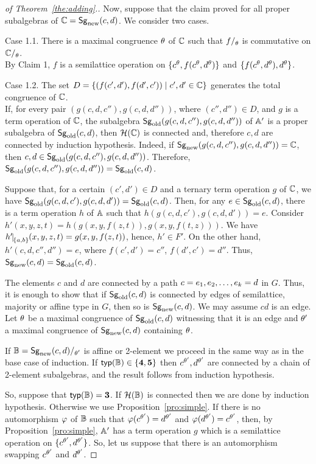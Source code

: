 \documentclass[11pt]{article}
\begin{document}
\begin{proof}[of Theorem~\ref{the:adding}.]
Now, suppose that the claim proved for all proper subalgebras of
${\mathbb C}={\sf Sg}_{\mathrm{new}}(c,d)$. We consider two cases.
\medskip

\noindent
{\sc Case 1.1.} There is a maximal congruence $\theta$ of
${\mathbb C}$ such that $f\fac\th$ is commutative on $\zC\fac\th$.\\[2mm]
By Claim 1, $f$ is a semilattice operation on
$\{c^\theta,f(c^\theta,d^\theta)\}$ and
$\{f(c^\theta,d^\theta),d^\theta\}$.
\medskip

\noindent
{\sc Case 1.2.} The set $D=\{(f(c',d'),f(d',c'))\mid c',d'\in{\mathbb C}\}$ 
generates the total congruence of ${\mathbb C}$.\\[2mm]
If, for every pair $(g(c,d,c''),g(c,d,d''))$, where $(c'',d'')\in D$, and $g$ is a term operation of ${\mathbb C}$,
the subalgebra ${\sf Sg}_{\mathrm{old}}(g(c,d,c''),g(c,d,d''))$ of ${\mathbb A}'$ is a
proper subalgebra of 
${\sf Sg}_{\mathrm{old}}(c,d)$, then ${\mathcal H}({\mathbb C})$ is connected and, therefore $c,d$ are connected 
by induction hypothesis. Indeed, if
${\sf Sg}_{\mathrm{new}}(g(c,d,c''),g(c,d,d''))={\mathbb C}$, then
$c,d\in{\sf Sg}_{\mathrm{old}}(g(c,d,c''),g(c,d,d''))$. Therefore,
${\sf Sg}_{\mathrm{old}}(g(c,d,c''),g(c,d,d''))={\sf Sg}_{\mathrm{old}}(c,d)$.

Suppose that, for a certain $(c',d')\in D$ and a ternary term
operation $g$ of ${\mathbb C}$, we have
${\sf Sg}_{\mathrm{old}}(g(c,d,c'),g(c,d,d'))={\sf Sg}_{\mathrm{old}}(c,d)$. Then, for any
$e\in{\sf Sg}_{\mathrm{old}}(c,d)$, there is a term operation $h$ of ${\mathbb A}$ such that
$h(g(c,d,c'),g(c,d,d'))=e$. Consider
$h'(x,y,z,t)=h(g(x,y,f(z,t)),g(x,y,f(t,z)))$. We have
$h'\red{\{a,b\}}(x,y,z,t)=g(x,y,f(z,t))$, hence, $h'\in F'$. On the
other hand, $h'(c,d,c'',d'')=e$, where $f(c',d')=c''$,
$f(d',c')=d''$. Thus, ${\sf Sg}_{\mathrm{new}}(c,d)={\sf Sg}_{\mathrm{old}}(c,d)$.

The elements $c$ and $d$ are connected by a path $c=e_1,e_2,\ldots, e_k=d$
in $G$. Thus, it is enough to show that if ${\sf Sg}_{\mathrm{old}}(c,d)$ is
connected by edges of semilattice, majority or affine type in $G$,
then so is ${\sf Sg}_{\mathrm{new}}(c,d)$. We may assume $cd$ is an edge. Let $\theta$ be a 
maximal congruence of
${\sf Sg}_{\mathrm{old}}(c,d)$ witnessing that it is an edge and $\theta'$ a maximal
congruence of ${\sf Sg}_{\mathrm{new}}(c,d)$ containing $\theta$. 

If $\zB=\Sgn{c,d}\fac{\th'}$ is affine or 2-element we proceed in
the same way as in the base case of induction. If
${\sf typ}({\mathbb B})\in\{{\bf4},{\bf5}\}$ then
$c^{\theta'},d^{\theta'}$ are connected by a chain of 2-element
subalgebras, and the result follows from induction hypothesis.

So, suppose that ${\sf typ}({\mathbb B})={\bf3}$. If
${\mathcal H}({\mathbb B})$ is connected then we are done by
induction hypothesis. Otherwise we use
Proposition~\ref{pro:simple}. If there is no automorphism $\varphi$ of ${\mathbb B}$
such that $\varphi(c^{\theta'})=d^{\theta'}$ and 
$\varphi(d^{\theta'})=c^{\theta'}$, then, by Proposition~\ref{pro:simple},
${\mathbb A}'$ has a term operation $g$ which is a semilattice operation on
$\{c^{\theta'},d^{\theta'}\}$. So, let us suppose that there is an
automorphism swapping $c^{\theta'}$ and $d^{\theta'}$.  


\end{proof}
\end{document}
